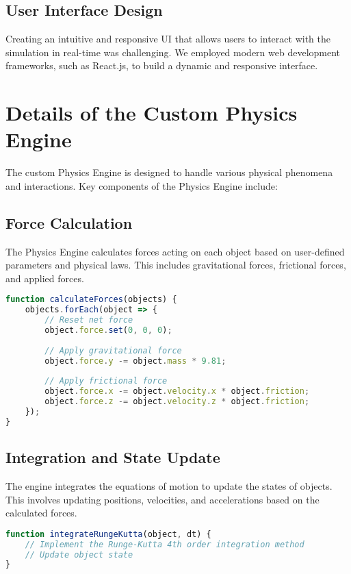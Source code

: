 \subsection{User Interface Design}

Creating an intuitive and responsive UI that allows users to interact with the simulation in real-time was challenging. We employed modern web development frameworks, such as React.js, to build a dynamic and responsive interface.

\section{Details of the Custom Physics Engine}

The custom Physics Engine is designed to handle various physical phenomena and interactions. Key components of the Physics Engine include:

\subsection{Force Calculation}

The Physics Engine calculates forces acting on each object based on user-defined parameters and physical laws. This includes gravitational forces, frictional forces, and applied forces.

\begin{lstlisting}[language=JavaScript, caption=Force Calculation]
function calculateForces(objects) {
    objects.forEach(object => {
        // Reset net force
        object.force.set(0, 0, 0);
        
        // Apply gravitational force
        object.force.y -= object.mass * 9.81;
        
        // Apply frictional force
        object.force.x -= object.velocity.x * object.friction;
        object.force.z -= object.velocity.z * object.friction;
    });
}
\end{lstlisting}

\subsection{Integration and State Update}

The engine integrates the equations of motion to update the states of objects. This involves updating positions, velocities, and accelerations based on the calculated forces.

\begin{lstlisting}[language=JavaScript, caption=State Update Using Runge-Kutta Method]
function integrateRungeKutta(object, dt) {
    // Implement the Runge-Kutta 4th order integration method
    // Update object state
}
\end{lstlisting}

